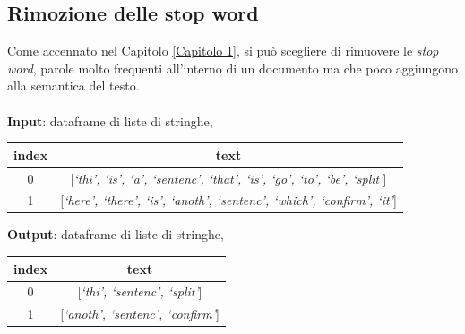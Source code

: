 \documentclass[12pt]{report}
\theoremstyle{definition}
\begin{document}
\subsection{Rimozione delle stop word}
Come accennato nel Capitolo \ref{Capitolo 1}, si può scegliere di rimuovere le \textit{stop word}, parole molto frequenti all'interno di un documento ma che poco aggiungono alla semantica del testo.
\\
\\
\textbf{Input}: dataframe di liste di stringhe,
\begin{center}
    \begin{tabular}{|c|c|}
    \hline
    \textbf{index} & \textbf{text} \\
    \hline
         0 & [\textit{`thi', `is', `a', `sentenc', `that', `is', `go', `to', `be', `split'}]\\
         1 & [\textit{`here', `there', `is', `anoth', `sentenc', `which', `confirm', `it'}]\\
    \hline
    \end{tabular}
\end{center}
\textbf{Output}: dataframe di liste di stringhe,
\begin{center}
    \begin{tabular}{|c|c|}
    \hline
    \textbf{index} & \textbf{text} \\
    \hline
         0 & [\textit{`thi', `sentenc', `split'}]\\
         1 & [\textit{`anoth', `sentenc', `confirm'}]\\
    \hline
    \end{tabular}
\end{center}
\end{document}
